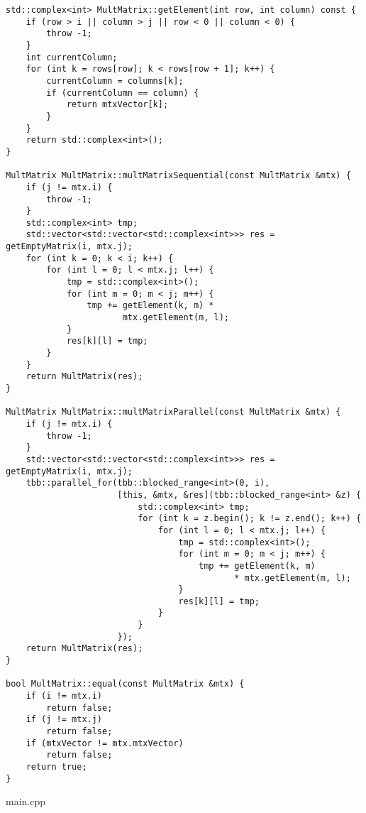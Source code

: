 \documentclass{report}
\begin{document}
\begin{lstlisting}
std::complex<int> MultMatrix::getElement(int row, int column) const {
    if (row > i || column > j || row < 0 || column < 0) {
        throw -1;
    }
    int currentColumn;
    for (int k = rows[row]; k < rows[row + 1]; k++) {
        currentColumn = columns[k];
        if (currentColumn == column) {
            return mtxVector[k];
        }
    }
    return std::complex<int>();
}

MultMatrix MultMatrix::multMatrixSequential(const MultMatrix &mtx) {
    if (j != mtx.i) {
        throw -1;
    }
    std::complex<int> tmp;
    std::vector<std::vector<std::complex<int>>> res = getEmptyMatrix(i, mtx.j);
    for (int k = 0; k < i; k++) {
        for (int l = 0; l < mtx.j; l++) {
            tmp = std::complex<int>();
            for (int m = 0; m < j; m++) {
                tmp += getElement(k, m) *
                       mtx.getElement(m, l);
            }
            res[k][l] = tmp;
        }
    }
    return MultMatrix(res);
}

MultMatrix MultMatrix::multMatrixParallel(const MultMatrix &mtx) {
    if (j != mtx.i) {
        throw -1;
    }
    std::vector<std::vector<std::complex<int>>> res = getEmptyMatrix(i, mtx.j);
    tbb::parallel_for(tbb::blocked_range<int>(0, i),
                      [this, &mtx, &res](tbb::blocked_range<int> &z) {
                          std::complex<int> tmp;
                          for (int k = z.begin(); k != z.end(); k++) {
                              for (int l = 0; l < mtx.j; l++) {
                                  tmp = std::complex<int>();
                                  for (int m = 0; m < j; m++) {
                                      tmp += getElement(k, m)
                                             * mtx.getElement(m, l);
                                  }
                                  res[k][l] = tmp;
                              }
                          }
                      });
    return MultMatrix(res);
}

bool MultMatrix::equal(const MultMatrix &mtx) {
    if (i != mtx.i)
        return false;
    if (j != mtx.j)
        return false;
    if (mtxVector != mtx.mtxVector)
        return false;
    return true;
}

\end{lstlisting}
main.cpp
\end{document}
